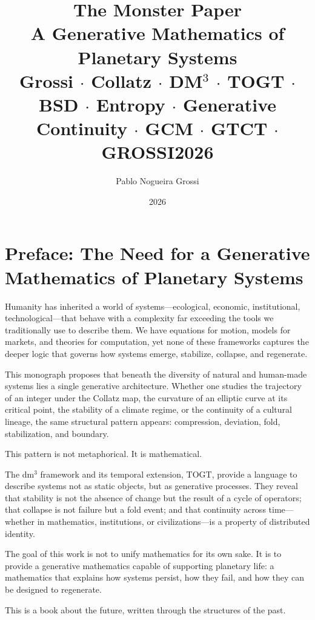 \documentclass[14pt, twoside, openright]{book}
\title{%
  \textbf{The Monster Paper}\\[0.4em]
  \large A Generative Mathematics of Planetary Systems\\[1em]
  \normalsize Grossi $\cdot$ Collatz $\cdot$ DM$^{3}$ $\cdot$ TOGT
  $\cdot$ BSD $\cdot$ Entropy $\cdot$ Generative Continuity
  $\cdot$ GCM $\cdot$ GTCT $\cdot$ GROSSI2026}
\author{Pablo Nogueira Grossi}
\date{2026}
\theoremstyle{definition}
\theoremstyle{remark}
\begin{document}
\maketitle

\frontmatter
\tableofcontents
\mainmatter

\chapter*{Preface: The Need for a Generative Mathematics of Planetary Systems}

Humanity has inherited a world of systems—ecological, economic, institutional,
technological—that behave with a complexity far exceeding the tools we
traditionally use to describe them. We have equations for motion, models for
markets, and theories for computation, yet none of these frameworks captures
the deeper logic that governs how systems emerge, stabilize, collapse, and
regenerate.

This monograph proposes that beneath the diversity of natural and human-made
systems lies a single generative architecture. Whether one studies the trajectory
of an integer under the Collatz map, the curvature of an elliptic curve at its
critical point, the stability of a climate regime, or the continuity of a
cultural lineage, the same structural pattern appears: compression, deviation,
fold, stabilization, and boundary.

This pattern is not metaphorical. It is mathematical.

The dm$^{3}$ framework and its temporal extension, TOGT, provide a language to
describe systems not as static objects, but as generative processes. They reveal
that stability is not the absence of change but the result of a cycle of
operators; that collapse is not failure but a fold event; and that continuity
across time—whether in mathematics, institutions, or civilizations—is a property
of distributed identity.

The goal of this work is not to unify mathematics for its own sake. It is to
provide a generative mathematics capable of supporting planetary life: a
mathematics that explains how systems persist, how they fail, and how they can
be designed to regenerate.

This is a book about the future, written through the structures of the past.

\end{document}
